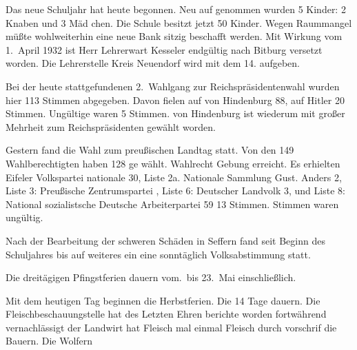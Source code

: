 

%
Das neue Schuljahr hat heute begonnen. Neu auf\ohb
genommen wurden 5 Kinder: 2 Knaben und 3 Mäd\ohb
chen. Die Schule besitzt jetzt 50 Kinder. Wegen\ob
Raummangel müßte wohl\unsicher weiterhin eine neue Bank sitzig beschafft werden.\ob
Mit Wirkung vom 1.\ April 1932 ist Herr Lehrerwart\ob
Kesseler endgültig nach Bitburg versetzt worden. Die\ob
Lehrerstelle Kreis Neuendorf wird mit dem 14.\unsicher\ob
aufgeben.

%
Bei der heute stattgefundenen 2.\ Wahlgang\ob
zur Reichspräsidentenwahl wurden hier 113 Stimmen\ob
abgegeben. Davon fielen auf von Hindenburg 88, auf\ob
Hitler 20 Stimmen. Ungültige waren 5 Stimmen.\ob
von Hindenburg ist wiederum mit großer Mehrheit\ob
zum Reichspräsidenten gewählt worden.

%
Gestern fand die Wahl zum preußischen Landtag\ob
statt. Von den 149 Wahlberechtigten haben 128 ge\ohb
wählt.\unsicher{} Wahlrecht Gebung erreicht. Es erhielten Eifeler\ob
Volkspartei nationale\unsicher{} 30, Liste 2a. Nationale\ob
Sammlung Gust. Anders 2, Liste 3: Preußische Zentrumspartei\unsicher\ob
{}, Liste 6: Deutscher Landvolk 3, und Liste 8: National\ohb
sozialistsche Deutsche Arbeiterpartei\unsicher{} 59\unsicher{} 13 Stimmen. Stimmen waren ungültig.

Nach der Bearbeitung der schweren Schäden in Seffern\ob
fand seit Beginn des Schuljahres bis auf weiteres\unsicher\ob
ein eine sonntäglich\unsicher{} Volksabstimmung statt.

%
Die dreitägigen Pfingstferien dauern vom.\ bis 23.\ Mai einschließlich.

%
Mit dem heutigen Tag beginnen die Herbstferien.\ob
Die 14 Tage dauern.\ob
Die Fleischbeschauungstelle hat des Letzten Ehren\ohb
berichte\unsicher{} worden fortwährend\unsicher{} vernachlässigt\ob
der Landwirt hat Fleisch\unsicher{} mal einmal Fleisch durch\unsicher\ob
\unsicher vorschrif\unsicher{} die Bauern. Die Wolfern\unsicher
\pend
